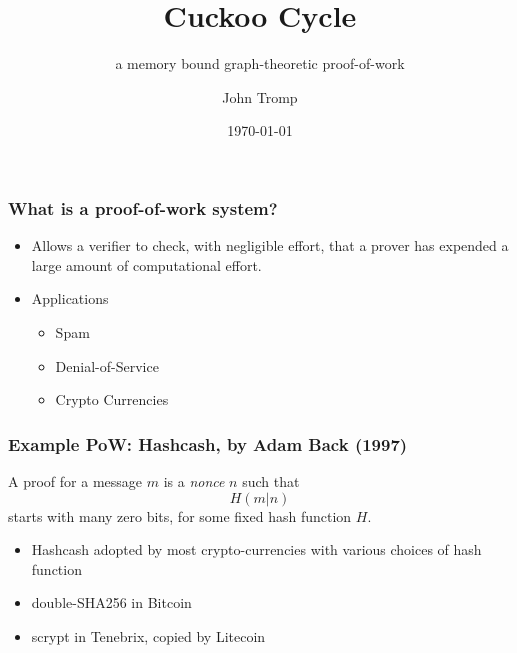 \documentclass{beamer}
\title{Cuckoo Cycle}
\subtitle{a memory bound graph-theoretic proof-of-work}
\author{John Tromp}
\date{\today}
\begin{document}
\begin{frame}
  \titlepage
\end{frame}


\begin{frame}
\frametitle{What is a proof-of-work system?}
\begin{itemize}
\item
Allows a verifier to check, with negligible effort, that a prover has expended a large amount of computational effort.
\item {Applications}
\begin{itemize}
\item Spam
\item Denial-of-Service
\item Crypto Currencies
\end{itemize}
\end{itemize}
\end{frame}

\begin{frame}
\frametitle{Example PoW: Hashcash, by Adam Back (1997)}
A \alert{proof} for a message $m$ is a {\em nonce} $n$ such that
\begin{equation*}
H(m|n)
\end{equation*} starts with many zero bits,
for some fixed hash function $H$.
\begin{itemize}
\item
Hashcash adopted by most crypto-currencies
with various choices of hash function
\item
double-SHA256 in Bitcoin
\item scrypt in Tenebrix, copied by Litecoin
\end{itemize}
\end{frame}
\end{document}
